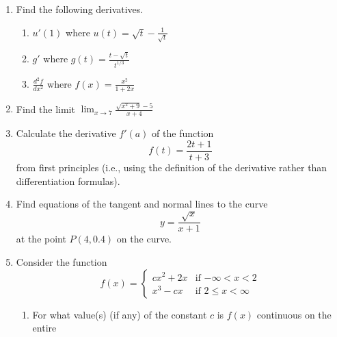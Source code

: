 \documentclass[12pt]{article}
\newcommand{\ds}{\displaystyle}
\begin{document}
\begin{enumerate}
\item Find the following derivatives.
  \begin{enumerate}
  \item $\ds u'(1)$
    where $\ds u(t)= \sqrt{t} - \frac{1}{\sqrt{t}}$
\vfill
  \item $\ds g'$
    where $\ds g(t) = \frac{t-\sqrt{t}}{t^{1/3}}$
\vfill
\newpage
  \item $\ds \frac{d^2f}{dx^2}$
    where $\ds f(x)=\frac{x^2}{1+2x}$
\vfill
  \end{enumerate}
\vfill
\item Find 
  the limit $\ds \lim_{x\to 7} \frac{\sqrt{x^2+9} - 5}{x+4}$
\vfill
\newpage
\item Calculate
  the derivative $f'(a)$ of the function 
  \begin{displaymath}
    f(t) = \frac{2t+1}{t+3}
  \end{displaymath}
  from first principles (i.e., using
  the definition of the derivative rather than differentiation formulas).
\newpage
\item Find
  equations of the tangent and normal lines to the curve
  \begin{displaymath}
    y = \frac{\sqrt{x}}{x+1}
  \end{displaymath}
  at the point $P(4,0.4)$ on the curve.
\newpage
\item Consider the function
  \begin{displaymath}
    f(x) = \begin{cases}
      cx^2 + 2x & \mbox{if $-\infty<x<2$} \\
      x^3 - cx  & \mbox{if $2\le x < \infty$}
    \end{cases}
  \end{displaymath}
  \begin{enumerate}
  \item For
    what value(s) (if any) of the constant $c$ is 
    $f(x)$ continuous on the entire

\end{enumerate}
\end{enumerate}
\end{document}

